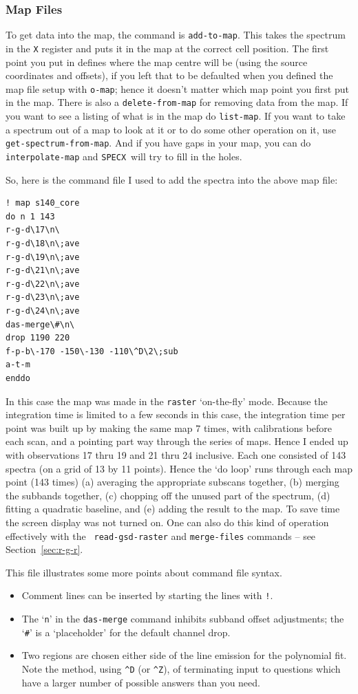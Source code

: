 \documentclass[11pt,twoside]{article}
\newcommand{\SPECX}{{\tt SPECX}}
\begin{document}
\subsubsection{Map Files}
\label{sec:specx_13.2}
To get data into the map, the command is {\tt add-to-map}.  This takes
the spectrum in the {\tt X} register and puts it in the map at the
correct cell position.  The first point you put in defines where the
map centre will be (using the source coordinates and offsets), if you 
left that to be defaulted when you defined the map file setup with
{\tt o-map}; hence it doesn't matter which map point you first put in 
the map. There is also a {\tt delete-from-map}
for removing data from the map.  If you want to see a listing of what is
in the map do {\tt list-map}. If you want to take a spectrum out of a
map to look at it or to do some other operation on it, use {\tt
get-spectrum-from-map}.  And if you have gaps in your map, you can do
{\tt interpolate-map} and \SPECX\ will try to fill in the holes.

So, here is the command file I used to add the spectra into the above
map file:

\begin{verbatim}
! map s140_core
do n 1 143
r-g-d\17\n\
r-g-d\18\n\;ave
r-g-d\19\n\;ave
r-g-d\21\n\;ave
r-g-d\22\n\;ave
r-g-d\23\n\;ave
r-g-d\24\n\;ave
das-merge\#\n\
drop 1190 220
f-p-b\-170 -150\-130 -110\^D\2\;sub
a-t-m
enddo
\end{verbatim}

In this case the map was made in the {\tt raster} `on-the-fly'
mode. Because the integration time is limited to a few seconds in this
case, the integration time per point was built up by making the same
map 7 times, with calibrations before each scan, and a pointing part
way through the series of maps. Hence I ended up with observations 17
thru 19 and 21 thru 24 inclusive. Each one consisted of 143 spectra
(on a grid of 13 by 11 points). Hence the `do loop' runs through each
map point (143 times) (a) averaging the appropriate subscans together,
(b) merging the subbands together, (c) chopping off the unused part of
the spectrum, (d) fitting a quadratic baseline, and (e) adding the
result to the map. To save time the screen display was not turned
on. One can also do this kind of operation effectively with the {\tt
read-gsd-raster} and {\tt merge-files} commands -- see
Section~\ref{sec:r-g-r}.

This file illustrates some more points about command file syntax.
\begin{itemize}
\item
Comment lines can be inserted by starting the lines with {\tt !}.
\item
The `{\tt{n}}' in the {\tt das-merge} command inhibits subband offset 
adjustments; the `\verb|#|' is a `placeholder' for the default channel
drop.
\item
Two regions are chosen either side of the line emission for the
polynomial fit.  Note the method, using \verb|^D| (or \verb|^Z|), of 
terminating
input to questions which have a larger number of possible answers
than you need.
\end{itemize}
\end{document}
